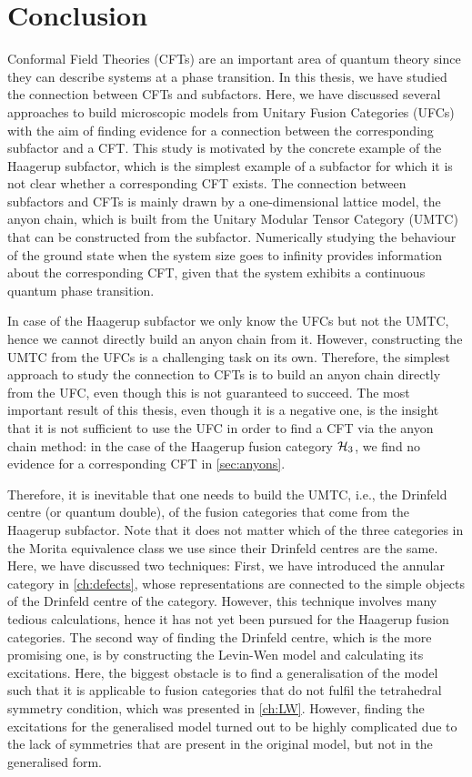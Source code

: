 \chapter{Conclusion}
\label{ch:conclusion}



Conformal Field Theories (CFTs) are an important area of quantum theory since they can describe systems at a phase transition. In this thesis, we have studied the connection between CFTs and subfactors. Here, we have discussed several approaches to build microscopic models from Unitary Fusion Categories (UFCs) with the aim of finding evidence for a connection between the corresponding subfactor and a CFT. This study is motivated by the concrete example of the Haagerup subfactor, which is the simplest example of a subfactor for which it is not clear whether a corresponding CFT exists. The connection between subfactors and CFTs is mainly drawn by a one-dimensional lattice model, the anyon chain, which is built from the Unitary Modular Tensor Category (UMTC) that can be constructed from the subfactor. Numerically studying the behaviour of the ground state when the system size goes to infinity provides information about the corresponding CFT, given that the system exhibits a continuous quantum phase transition.

In case of the Haagerup subfactor we only know the UFCs but not the UMTC, hence we cannot directly build an anyon chain from it. However, constructing the UMTC from the UFCs is a challenging task on its own. Therefore, the simplest approach to study the connection to CFTs is to build an anyon chain directly from the UFC, even though this is not guaranteed to succeed. The most important result of this thesis, even though it is a negative one, is the insight that it is not sufficient to use the UFC in order to find a CFT via the anyon chain method: in the case of the Haagerup fusion category ${\mathcal{H}_3}$, we find no evidence for a corresponding CFT in \cref{sec:anyons}.

Therefore, it is inevitable that one needs to build the UMTC, i.e., the Drinfeld centre (or quantum double), of the fusion categories that come from the Haagerup subfactor. Note that it does not matter which of the three categories in the Morita equivalence class we use since their Drinfeld centres are the same. Here, we have discussed two techniques: First, we have introduced the annular category in \cref{ch:defects}, whose representations are connected to the simple objects of the Drinfeld centre of the category. However, this technique involves many tedious calculations, hence it has not yet been pursued for the Haagerup fusion categories. The second way of finding the Drinfeld centre, which is the more promising one, is by constructing the Levin-Wen model and calculating its excitations. Here, the biggest obstacle is to find a generalisation of the model such that it is applicable to fusion categories that do not fulfil the tetrahedral symmetry condition, which was presented in \cref{ch:LW}. However, finding the excitations for the generalised model turned out to be highly complicated due to the lack of symmetries that are present in the original model, but not in the generalised form. 

